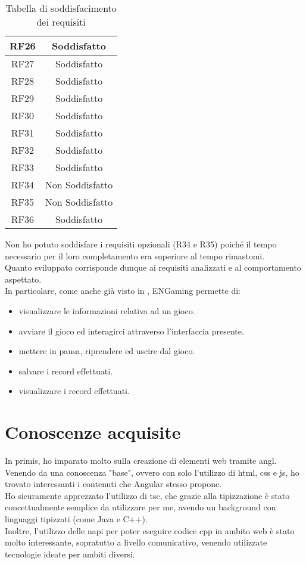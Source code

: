 \begin{longtable}{|c|c|}
    \hline
    RF26&Soddisfatto\\
    \hline
    RF27&Soddisfatto\\
    \hline
    RF28&Soddisfatto\\
    \hline
    RF29&Soddisfatto\\
    \hline
    RF30&Soddisfatto\\
    \hline
    RF31&Soddisfatto\\
    \hline
    RF32&Soddisfatto\\
    \hline
    RF33&Soddisfatto\\
    \hline
    RF34&Non Soddisfatto\\
    \hline
    RF35&Non Soddisfatto\\
    \hline
    RF36&Soddisfatto
    \hline
    \caption{Tabella di soddisfacimento dei requisiti}
\end{longtable}
Non ho potuto soddisfare i requisiti opzionali (R34 e R35) poiché il tempo necessario per il loro completamento era superiore al tempo rimastomi.\\
Quanto sviluppato corrisponde dunque ai requisiti analizzati e al comportamento aspettato.\\
In particolare, come anche già visto in , ENGaming permette di:
\begin{itemize}
    \item visualizzare le informazioni relativa ad un gioco.
    \item avviare il gioco ed interagirci attraverso l'interfaccia presente.
    \item mettere in pausa, riprendere ed uscire dal gioco.
    \item salvare i record effettuati.
    \item visualizzare i record effettuati.
\end{itemize}
\section{Conoscenze acquisite}
In primis, ho imparato molto sulla creazione di elementi web tramite \gls{angl}. Venendo da una conoscenza "base", ovvero con solo l'utilizzo di \gls{html}, \gls{css} e \gls{js}, ho trovato interessanti i contenuti che Angular stesso propone.\\
Ho sicuramente apprezzato l'utilizzo di \gls{tsc}, che grazie alla tipizzazione è stato concettualmente semplice da utilizzare per me, avendo un background con linguaggi tipizzati (come Java e C++).\\
Inoltre, l'utilizzo delle \gls{napi} per poter eseguire codice \gls{cpp} in ambito web è stato molto interessante, sopratutto a livello comunicativo, venendo utilizzate tecnologie ideate per ambiti diversi.
